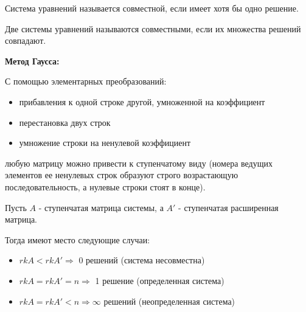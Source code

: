 \documentclass{article}
\begin{document}
Система уравнений называется совместной, если имеет хотя бы одно решение.

Две системы уравнений называются совместными, если их множества решений совпадают.

\textbf{Метод Гаусса:}

С помощью элементарных преобразований:
\begin{itemize}
    \item прибавления к одной строке другой, умноженной на коэффициент
    \item перестановка двух строк
    \item умножение строки на ненулевой коэффициент
\end{itemize}
любую матрицу можно привести к ступенчатому виду (номера ведущих элементов
ее ненулевых строк образуют строго возрастающую последовательность, а
нулевые строки стоят в конце).

Пусть $A$ - ступенчатая матрица системы, а $A'$ - ступенчатая расширенная матрица.

Тогда имеют место следующие случаи:
\begin{itemize}
    \item $rk A < rk A' \Rightarrow$ 0 решений (система несовместна)
    \item $rk A = rk A' = n \Rightarrow$ 1 решение (определенная система)
    \item $rk A = rk A' < n \Rightarrow \infty$ решений (неопределенная система)
\end{itemize}

\end{document}
